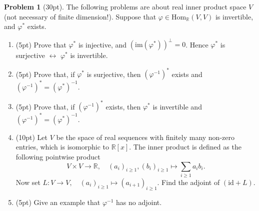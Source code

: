 \documentclass{MainStyle}
\theoremstyle{definition}
\newtheorem{problem}{Problem}
\begin{document}
\newpage

\begin{problem}[30pt]
The following problems are about real inner product space $V$ (not necessary of finite dimension!). Suppose that $\varphi \in \mathrm{Hom}_{\mathbb R}(V,V)$ is invertible, and $\varphi^\ast$ exists.
\begin{enumerate}
    \item (5pt) Prove that $\varphi ^\ast$ is injective, and $(\mathrm{im}(\varphi^\ast ))^\perp=0$. Hence $\varphi^\ast$ is surjective $\leftrightarrow$ $\varphi^\ast$ is invertible.
    \item (5pt) Prove that, if $\varphi^\ast$ is surjective, then $(\varphi^{-1})^{\ast}$ exists and $(\varphi^{-1})^\ast=(\varphi^\ast)^{-1}$.
    \item (5pt) Prove that, if $(\varphi^{-1})^\ast$ exists, then $\varphi^\ast$ is invertible and $(\varphi^{-1})^\ast=(\varphi^\ast)^{-1}$.
    \item (10pt) Let $V$ be the space of real sequences with finitely many non-zero entries, which is isomorphic to $\mathbb R[x]$. The inner product is defined as the following pointwise product
          \begin{equation}
              V\times V\to \mathbb R,\quad (a_i)_{i\geq 1},(b_i)_{i\geq 1}\mapsto \sum_{i\geq 1}a_ib_i.
          \end{equation}
          Now set $L:V\to V,\quad (a_i)_{i\geq 1}\mapsto (a_{i+1})_{i\geq 1}$. Find the adjoint of $(\mathrm{id}+L)$.
    \item (5pt) Give an example that $\varphi^{-1}$ has no adjoint.
\end{enumerate}
\end{problem}

\newpage
\end{document}
